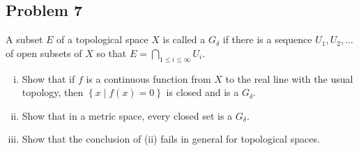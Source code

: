 \documentclass[12pt]{article}
\newcommand\setb[1]{\left \{ #1 \right \}}
\theoremstyle{definition}
\begin{document}
\subsection{Problem 7 \texorpdfstring{\cite{Pilar}}{}}
A subset $E$ of a topological space $X$ is called a $G_{\delta}$ if there is a sequence $U_1, U_2, \dotsc$ of open subsets of $X$ so that $E = \bigcap\limits_{1 \leq i \leq \infty} U_i$.
\begin{enumerate}[(i)]
    \item Show that if $f$ is a continuous function from $X$ to the real line with the usual topology, then $\setb{ x \mid f(x) = 0 }$ is closed and is a $G_{\delta}$.
    \item Show that in a metric space, every closed set is a $G_{\delta}$.
    \item Show that the conclusion of (ii) fails in general for topological spaces.
\end{enumerate}
\end{document}
